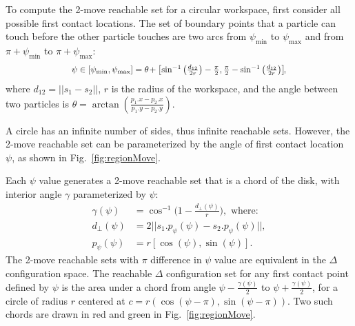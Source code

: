 To compute the 2-move reachable set for a circular workspace, first consider all possible first contact locations.
 The set of boundary points that a particle can touch before the  other particle  touches are two arcs from $\psi_{\min}$ to $\psi_{\max}$  and from $\pi+ \psi_{\min}$ to $\pi+ \psi_{\max}$:
 \begin{align}\label{eq:psiMinMax}
\scalebox{.9}{$   \psi \in [\psi_{\min}, \psi_{\max}]= \theta \!+  \left[ \sin^{-1} \left(\frac{d_{12}}{2r}  \right)- \frac{\pi}{2},  \frac{\pi}{2} -\sin^{-1} \left(\frac{d_{12}}{2r} \right) \right]\!\!,$}
\end{align}
where $d_{12}= ||s_1 - s_2||$, $r$ is the radius of the workspace,
and the angle between two particles is $\theta = \arctan(\frac{p_1.x-p_2.x}{p_1.y - p_2.y})$. 
 
 


%

A circle has an infinite number of sides, thus infinite reachable sets. However, the 2-move reachable set can be parameterized by the angle of first contact location $\psi$, as shown in Fig.~\ref{fig:regionMove}.

Each $\psi$ value generates a 2-move reachable set that is a chord of the disk, with interior angle $\gamma$ parameterized by $\psi$:
\begin{align}\label{eq:gamma}
\gamma(\psi) &= \cos^{-1} \Big(1-\frac{d_\perp(\psi)}{r} \Big), \textrm{ where:}\\ \label{eq:dprep}
d_\perp(\psi)&= 2 ||s_1.p_\psi(\psi) - s_2.p_\psi(\psi)||,\\ \label{eq:ppsi}
p_\psi(\psi) &= r[\cos(\psi ), \sin(\psi )].
\end{align} 
The 2-move reachable sets with $\pi$ difference in $\psi$ value are equivalent in the  $\Delta$ configuration space. 
The reachable $\Delta$ configuration set for any first contact point defined by $\psi$ is the area under a chord from angle $\psi- \frac{\gamma(\psi)}{2}$ to $\psi+ \frac{\gamma(\psi)}{2}$, for a circle of radius $r$ centered at $c = r(\cos(\psi-\pi), \sin(\psi-\pi))$. Two such chords are drawn in red and green in Fig.~\ref{fig:regionMove}.

